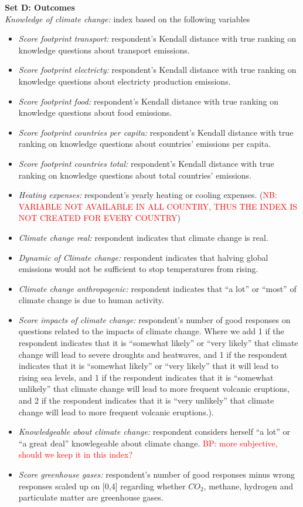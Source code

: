 \documentclass{article}
\begin{document}
\noindent \textbf{Set D: Outcomes}\\
\textit{Knowledge of climate change:} index based on the following variables
\begin{itemize}
	\item \textit{Score footprint transport:} respondent's Kendall distance with true ranking on knowledge questions about transport emissions.
	\item \textit{Score footprint electricty:} respondent's Kendall distance with true ranking on knowledge questions about electricty production emissions.
	\item \textit{Score footprint food:} respondent's Kendall distance with true ranking on knowledge questions about food emissions.
	\item \textit{Score footprint countries per capita:} respondent's Kendall distance with true ranking on knowledge questions about countries' emissions per capita.
	\item \textit{Score footprint countries total:} respondent's Kendall distance with true ranking on knowledge questions about total countries' emissions.
	\item \textit{Heating expenses:} respondent's yearly heating or cooling expenses. (\textcolor{red}{NB: VARIABLE NOT AVAILABLE IN ALL COUNTRY, THUS THE INDEX IS NOT CREATED FOR EVERY COUNTRY})
	\item \textit{Climate change real:} respondent indicates that climate change is real.
	\item \textit{Dynamic of Climate change:} respondent indicates that halving global emissions would not be sufficient to stop temperatures from rising.
	\item \textit{Climate change anthropogenic:} respondent indicates that ``a lot'' or ``most'' of climate change is due to human activity.

	\item \textit{Score impacts of climate change:} respondent's number of good responses on questions related to the impacts of climate change. Where we add 1 if the respondent indicates that it is ``somewhat likely'' or ``very likely'' that climate change will lead to severe droughts and heatwaves, and 1 if the respondent indicates that it is ``somewhat likely'' or ``very likely'' that it will lead to rising sea levels, and 1 if the respondent indicates that it is  ``somewhat unlikely'' that climate change will lead to more frequent volcanic eruptions, and 2 if the respondent indicates that it is  ``very unlikely'' that climate change will lead to more frequent volcanic eruptions.).

	\item \textit{Knowledgeable about climate change:} respondent considers herself ``a lot'' or ``a great deal'' knowlegeable about climate change.
\textcolor{red}{BP: more subjective, should we keep it in this index?}
	\item \textit{Score greenhouse gases:} respondent's number of good responses minus wrong responses scaled up on [0,4] regarding whether $CO_2$, methane, hydrogen and particulate matter are greenhouse gases.
\end{itemize}
\end{document}
